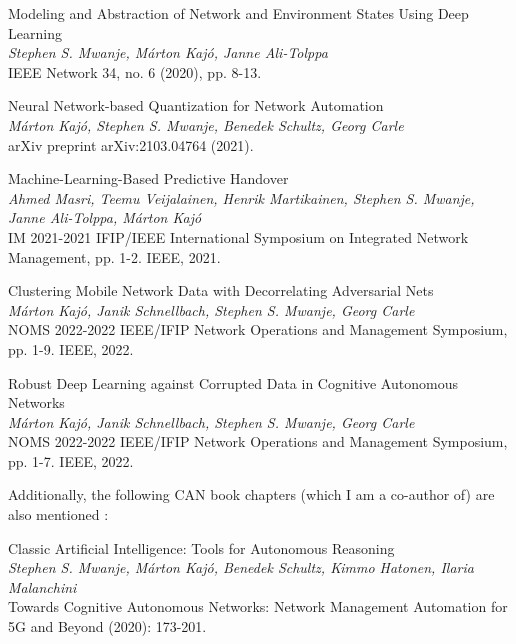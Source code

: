 			\begin{publication}
				Modeling and Abstraction of Network and Environment States Using Deep Learning \\
				\textit{Stephen S. Mwanje, Márton Kajó, Janne Ali-Tolppa} \\
				IEEE Network 34, no. 6 (2020), pp. 8-13.
			\end{publication}
					
			\begin{publication}
				Neural Network-based Quantization for Network Automation \\
				\textit{Márton Kajó, Stephen S. Mwanje, Benedek Schultz, Georg Carle} \\
				arXiv preprint arXiv:2103.04764 (2021).
			\end{publication}
			
			\begin{publication}
				Machine-Learning-Based Predictive Handover \\
				\textit{Ahmed Masri, Teemu Veijalainen, Henrik Martikainen, Stephen S. Mwanje, Janne Ali-Tolppa, Márton Kajó} \\
				IM 2021-2021 IFIP/IEEE International Symposium on Integrated Network Management, pp. 1-2. IEEE, 2021.
			\end{publication}
			
			\begin{publication}
				Clustering Mobile Network Data with Decorrelating Adversarial Nets \\
				\textit{Márton Kajó, Janik Schnellbach, Stephen S. Mwanje, Georg Carle} \\
				NOMS 2022-2022 IEEE/IFIP Network Operations and Management Symposium, pp. 1-9. IEEE, 2022.
			\end{publication}
		
			\begin{publication}
				Robust Deep Learning against Corrupted Data in Cognitive Autonomous Networks \\
				\textit{Márton Kajó, Janik Schnellbach, Stephen S. Mwanje, Georg Carle} \\
				NOMS 2022-2022 IEEE/IFIP Network Operations and Management Symposium, pp. 1-7. IEEE, 2022.
			\end{publication}
			
			Additionally, the following \ac{CAN} book chapters (which I am a co-author of) are also mentioned \cite{can_book}:
			
			\begin{publication}
				Classic Artificial Intelligence: Tools for Autonomous Reasoning \\
				\textit{Stephen S. Mwanje, Márton Kajó, Benedek Schultz, Kimmo Hatonen, Ilaria Malanchini} \\
				Towards Cognitive Autonomous Networks: Network Management Automation for 5G and Beyond (2020): 173-201.
			\end{publication}
			

